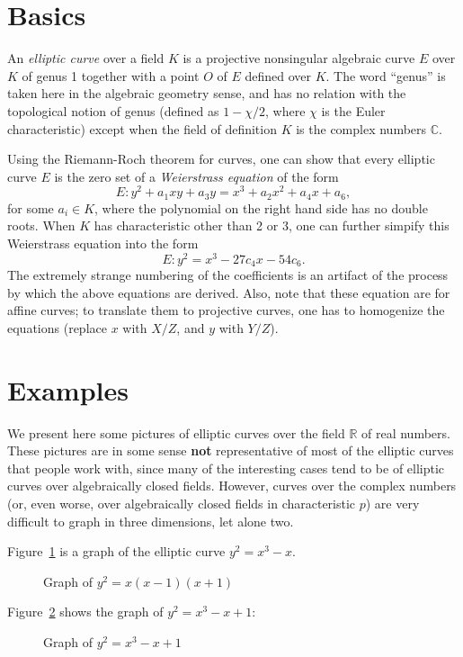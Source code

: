 \documentclass{article}
\theoremstyle{definition}
\begin{document}
\section{Basics}
An {\em elliptic curve} over a field $K$ is a projective nonsingular algebraic curve $E$ over $K$ of genus 1 together with a point $O$ of $E$ defined over $K$. The word ``genus'' is taken here in the algebraic geometry sense, and has no relation with the topological notion of genus (defined as $1 - \chi/2$, where $\chi$ is the Euler characteristic) except when the field of definition $K$ is the complex numbers $\mathbb{C}$.

Using the Riemann-Roch theorem for curves, one can show that every elliptic curve $E$ is the zero set of a {\em Weierstrass equation} of the form
$$
E: y^2 + a_1 xy + a_3 y = x^3 + a_2 x^2 + a_4 x + a_6,
$$
for some $a_i \in K$, where the polynomial on the right hand side has no double roots. When $K$ has characteristic other than 2 or 3, one can further simpify this Weierstrass equation into the form
$$
E: y^2 = x^3 - 27 c_4 x - 54 c_6.
$$
The extremely strange numbering of the coefficients is an artifact of the process by which the above equations are derived. Also, note that these equation are for affine curves; to translate them to projective curves, one has to homogenize the equations (replace $x$ with $X/Z$, and $y$ with $Y/Z$).

\section{Examples}

We present here some pictures of elliptic curves over the field $\mathbb{R}$ of real numbers. These pictures are in some sense {\bf not} representative of most of the elliptic curves that people work with, since many of the interesting cases tend to be of elliptic curves over algebraically closed fields. However, curves over the complex numbers (or, even worse, over algebraically closed fields in characteristic $p$) are very difficult to graph in three dimensions, let alone two.

Figure~\ref{01-1} is a graph of the elliptic curve $y^2 = x^3 - x$.
\begin{figure}
\caption{Graph of $y^2 = x(x-1)(x+1)$}
\label{01-1}
\end{figure}

Figure~\ref{0-11} shows the graph of $y^2 = x^3 - x + 1$:
\begin{figure}
\caption{Graph of $y^2 = x^3 - x + 1$}
\label{0-11}
\end{figure}
\end{document}
